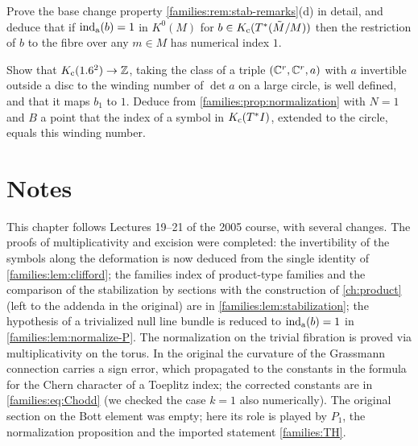 \begin{exercise}\label{families:ex:pullback-index}
  Prove the base change property \cref{families:rem:stab-remarks}(d) in detail,
  and deduce that if $\operatorname{ind}_{\mathrm{a}}(b)=1$ in $K^0(M)$ for $b\in K_{\mathrm{c}}(T^*(\tilde M/M))$
  then the restriction of $b$ to the fibre over any $m\in M$ has numerical
  index $1$.
\end{exercise}

\begin{exercise}\label{families:ex:winding}
  Show that $K_{\mathrm{c}}(1.6^2)\to\mathbb{Z}$, taking the class of a triple
  $(\mathbb{C}^r,\mathbb{C}^r,a)$ with $a$ invertible outside a disc to the winding number of
  $\det a$ on a large circle, is well defined, and that it maps $b_1$ to $1$.
  Deduce from \cref{families:prop:normalization} with $N=1$ and $B$ a point
  that the index of a symbol in $K_{\mathrm{c}}(T^*I)$, extended to the circle, equals
  this winding number.
\end{exercise}

\section*{Notes}
This chapter follows Lectures 19--21 of the 2005 course, with several
changes. The proofs of multiplicativity and excision were completed: the
invertibility of the symbols along the deformation is now deduced from the
single identity of \cref{families:lem:clifford}; the families index of
product-type families and the comparison of the stabilization by sections with
the construction of \cref{ch:product} (left to the addenda in the original)
are in \cref{families:lem:stabilization}; the hypothesis of a trivialized null
line bundle is reduced to $\operatorname{ind}_{\mathrm{a}}(b)=1$ in \cref{families:lem:normalize-P}.
The normalization on the trivial fibration is proved via multiplicativity on
the torus. In the original the curvature of the Grassmann connection carries
a sign error, which propagated to the constants in the formula for the Chern
character of a Toeplitz index; the corrected constants are in
\eqref{families:eq:Chodd} (we checked the case $k=1$ also numerically).
The original section on the Bott element was empty; here its role is played
by $P_1$, the normalization proposition and the imported statement
\ref{families:TH}.

